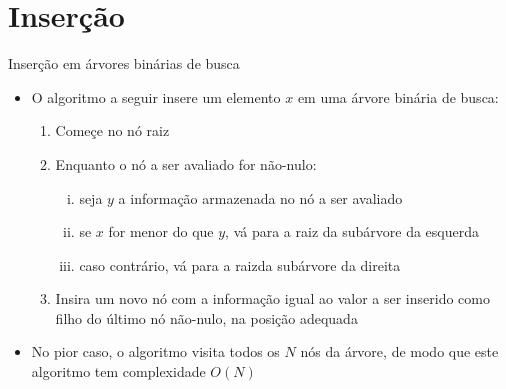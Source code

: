 \section{Inserção}

\begin{frame}[fragile]{Inserção em árvores binárias de busca}
    \begin{itemize}
	    \item O algoritmo a seguir insere um elemento $x$ em uma árvore binária de busca:

	\begin{enumerate}
		\item Começe no nó raiz

		\item Enquanto o nó a ser avaliado for não-nulo:

		\begin{enumerate}[i.]
            \item seja $y$ a informação armazenada no nó a ser avaliado

            \item se $x$ for menor do que $y$, vá para a raiz da subárvore da esquerda

            \item caso contrário, vá para a raizda subárvore da direita
		\end{enumerate}

		\item Insira um novo nó com a informação igual ao valor a ser inserido como { filho} do último nó não-nulo, na posição adequada
	\end{enumerate}

        \item No pior caso, o algoritmo visita todos os $N$ nós da árvore, de modo que este algoritmo tem complexidade $O(N)$

    \end{itemize}
\end{frame} 

